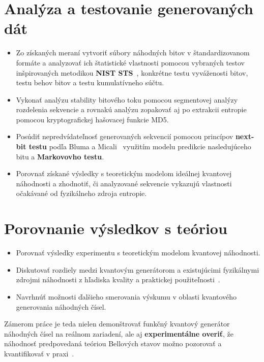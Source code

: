 \section{Analýza a testovanie generovaných dát}\label{sec:analyza-testovanie}

\begin{itemize}

  \item Zo získaných meraní vytvoriť súbory náhodných bitov v štandardizovanom formáte a analyzovať ich štatistické vlastnosti pomocou vybraných testov inšpirovaných metodikou \textbf{NIST STS}~\cite{NIST_SP800-22}, konkrétne testu vyváženosti bitov, testu behov bitov a testu kumulatívneho súčtu.

  \item Vykonať analýzu stability bitového toku pomocou segmentovej analýzy rozdelenia sekvencie a rovnakú analýzu zopakovať aj po extrakcii entropie pomocou kryptografickej hašovacej funkcie MD5.

  \item Posúdiť nepredvídateľnosť generovaných sekvencií pomocou princípov \textbf{next-bit testu} podľa Bluma a Micali~\cite{BlumMicali1984} využitím modelu predikcie nasledujúceho bitu a \textbf{Markovovho testu}.

  \item Porovnať získané výsledky s teoretickým modelom ideálnej kvantovej náhodnosti a zhodnotiť, či analyzované sekvencie vykazujú vlastnosti očakávané od fyzikálneho zdroja entropie.

\end{itemize}

\section{Porovnanie výsledkov s teóriou}\label{sec:porovnanie}
\begin{itemize}
  \item Porovnať výsledky experimentu s teoretickým modelom kvantovej náhodnosti.
  \item Diskutovať rozdiely medzi kvantovým generátorom a existujúcimi fyzikálnymi zdrojmi náhodnosti z hľadiska kvality a praktickej použiteľnosti~\cite{Bastos2020_ON_PRNG}.
  \item Navrhnúť možnosti ďalšieho smerovania výskumu v oblasti kvantového generovania náhodných čísel.
\end{itemize}

Zámerom práce je teda nielen demonštrovať funkčný kvantový generátor náhodných čísel na reálnom zariadení, ale aj \textbf{experimentálne overiť}, že náhodnosť predpovedaná teóriou Bellových stavov možno pozorovať a kvantifikovať v praxi~\cite{PhysicsPhysiqueFizika.1.195}.
